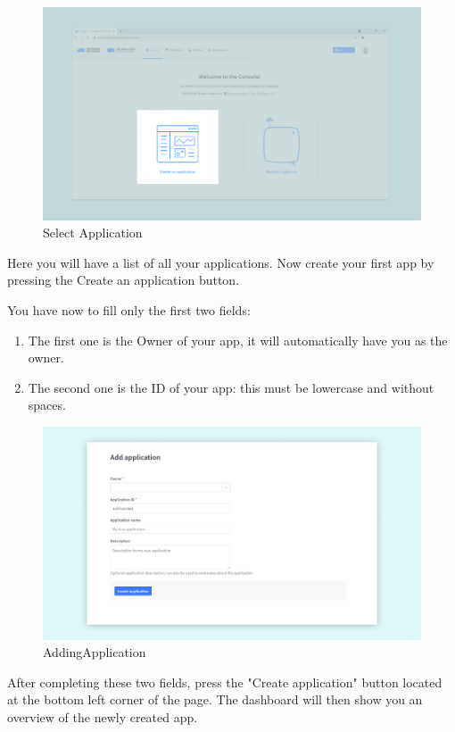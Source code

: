 \begin{itemize}
	\begin{figure}
		\begin{center}
			\includegraphics[width=0.7\linewidth]{Images/LORA/SelectApplication.png}
			\caption{Select Application}
			\label{Select Application}
		\end{center}
	\end{figure}
	
	Here you will have a list of all your applications. Now create your first app by pressing the Create an application button.
	
	You have now to fill only the first two fields:
	
	\begin{enumerate}
		\item The first one is the Owner of your app, it will automatically have you as the owner.
		\item The second one is the ID of your app: this must be lowercase and without spaces.
	\end{enumerate}
	
	\begin{figure}
		\begin{center}
			\includegraphics[width=0.7\linewidth]{Images/LORA/AddingApplication.png}
			\caption{AddingApplication}
			\label{AddingApplication} 
		\end{center}
	\end{figure}
	
	After completing these two fields, press the "Create application" button located at the bottom left corner of the page. The dashboard will then show you an overview of the newly created app. \cite{ArduinoTTN:2024}
	

\end{itemize}
